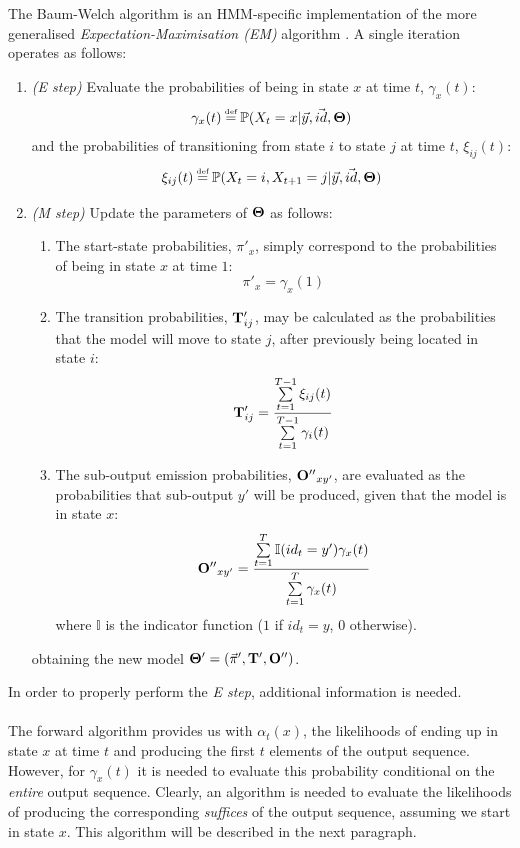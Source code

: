 \documentclass[12pt,a4paper,twoside,openright]{report}
\newcommand\myeq{\stackrel{\mathclap{\tiny\mbox{def}}}{=}}
\begin{document}
The Baum-Welch algorithm is an HMM-specific implementation of the more generalised \emph{Expectation-Maximisation (EM)} algorithm \cite{dempster1977maximum}. A single iteration operates as follows:
\begin{enumerate}
	\item \emph{(E step)} Evaluate the probabilities of being in state $x$ at time $t$, $\gamma_x(t)$:
	\[\gamma_x(t) \myeq \mathbb{P}(X_t = x | \vec{y}, \vec{id}, {\bf\Theta})\]
	and the probabilities of transitioning from state $i$ to state $j$ at time $t$, $\xi_{ij}(t)$:
	\[\xi_{ij}(t) \myeq \mathbb{P}(X_t = i, X_{t+1} = j | \vec{y}, \vec{id}, {\bf\Theta})\]
	\item \emph{(M step)} Update the parameters of ${\bf\Theta}$ as follows:
	\begin{enumerate}
		\item The start-state probabilities, $\pi'_x$, simply correspond to the probabilities of being in state $x$ at time $1$:
				\[\pi'_x = \gamma_x(1)\]
		\item The transition probabilities, ${\bf T}'_{ij}$, may be calculated as the probabilities that the model will move to state $j$, after previously being located in state $i$:
				\[{\bf T}'_{ij} = \frac{\sum\limits_{t=1}^{T-1}{\xi_{ij}(t)}}{\sum\limits_{t=1}^{T-1}{\gamma_i(t)}}\]
		\item The sub-output emission probabilities, ${\bf O''}_{xy'}$, are evaluated as the probabilities that sub-output $y'$ will be produced, given that the model is in state $x$:
			\[{\bf O''}_{xy'} = \frac{\sum\limits_{t=1}^{T}{\mathbb{I}(id_t = y')}\gamma_x(t)}{\sum\limits_{t=1}^{T}{\gamma_x(t)}}\]
			where $\mathbb{I}$ is the indicator function ($1$ if $id_t = y$, $0$ otherwise).
	\end{enumerate}
		obtaining the new model ${\bf\Theta'} = (\vec{\pi}', {\bf T'}, {\bf O''})$.
\end{enumerate}
In order to properly perform the \emph{E step}, additional information is needed.\\ \\ The forward algorithm provides us with $\alpha_t(x)$, the likelihoods of ending up in state $x$ at time $t$ and producing the first $t$ elements of the output sequence. However, for $\gamma_x(t)$ it is needed to evaluate this probability conditional on the \emph{entire} output sequence. Clearly, an algorithm is needed to evaluate the likelihoods of producing the corresponding \emph{suffices} of the output sequence, assuming we start in state $x$. This algorithm will be described in the next paragraph.
\end{document}
